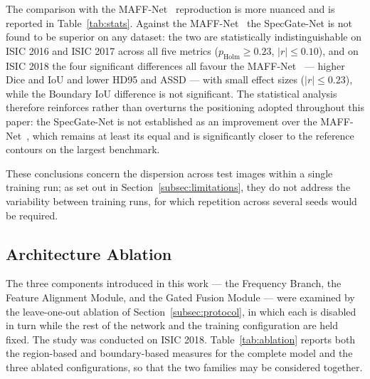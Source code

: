 The comparison with the MAFF-Net~\cite{ref15} reproduction is more nuanced and is reported in Table~\ref{tab:stats}. Against the MAFF-Net~\cite{ref15} the SpecGate-Net is not found to be superior on any dataset: the two are statistically indistinguishable on ISIC 2016 and ISIC 2017 across all five metrics ($p_{\mathrm{Holm}}\ge 0.23$, $\lvert r\rvert\le 0.10$), and on ISIC 2018 the four significant differences all favour the MAFF-Net~\cite{ref15} --- higher Dice and IoU and lower HD95 and ASSD --- with small effect sizes ($\lvert r\rvert\le 0.23$), while the Boundary IoU difference is not significant. The statistical analysis therefore reinforces rather than overturns the positioning adopted throughout this paper: the SpecGate-Net is not established as an improvement over the MAFF-Net~\cite{ref15}, which remains at least its equal and is significantly closer to the reference contours on the largest benchmark.

These conclusions concern the dispersion across test images within a single training run; as set out in Section~\ref{subsec:limitations}, they do not address the variability between training runs, for which repetition across several seeds would be required.

\subsection{Architecture Ablation}
\label{subsec:ablationr}

The three components introduced in this work --- the Frequency Branch, the Feature Alignment Module, and the Gated Fusion Module --- were examined by the leave-one-out ablation of Section~\ref{subsec:protocol}, in which each is disabled in turn while the rest of the network and the training configuration are held fixed. The study was conducted on ISIC 2018. Table~\ref{tab:ablation} reports both the region-based and boundary-based measures for the complete model and the three ablated configurations, so that the two families may be considered together.


